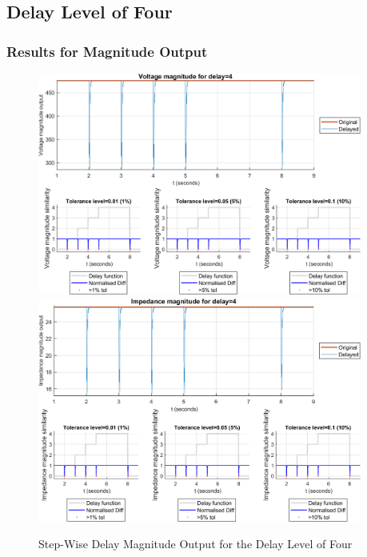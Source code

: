 \subsection{Delay Level of Four}
\subsubsection{Results for Magnitude Output}

\begin{figure}
    \caption{Step-Wise Delay Magnitude Output for the Delay Level of Four}
    \includegraphics[width=0.95\textwidth]{PMUsim-figures/DelayOf_4/Step_vMagnitude.png}    
      \includegraphics[width=0.95\textwidth]{PMUsim-figures/DelayOf_4/Step_iMagnitude.png}      
    \label{fig:PMUsimStep_Four_Magnitude}
    \begin{small}
     \end{small}

\end{figure}

